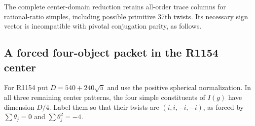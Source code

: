 The complete center-domain reduction retains all-order trace columns for
rational-ratio simples, including possible primitive 37th twists. Its
necessary sign vector is incompatible with pivotal conjugation parity,
as follows.



\subsection{A forced four-object packet in the R1154 center}
\label{subsec:creative-r1154-packet}

For R1154 put $D=540+240\sqrt5$ and use the positive spherical
normalization. In all three remaining center patterns, the four simple
constituents of $I(g)$ have dimension $D/4$. Label them so that their
twists are $(i,i,-i,-i)$, as forced by
$\sum\theta_j=0$ and $\sum\theta_j^2=-4$.

